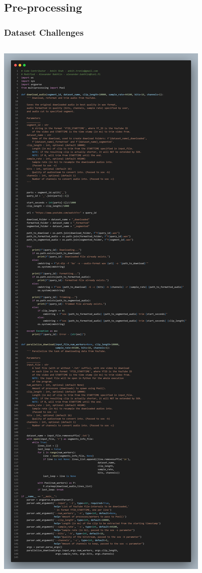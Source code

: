 \documentclass[aspectratio=169, 11pt]{beamer}
\begin{document}
\subsection{Pre-processing}

\begin{frame}
  \frametitle{Dataset Challenges}

  \begin{columns}
    \begin{column}{0.1\textwidth} %
      \includegraphics[width=\textwidth]{image/short_code.png}
    \end{column}


\end{columns}
\end{frame}
\end{document}
